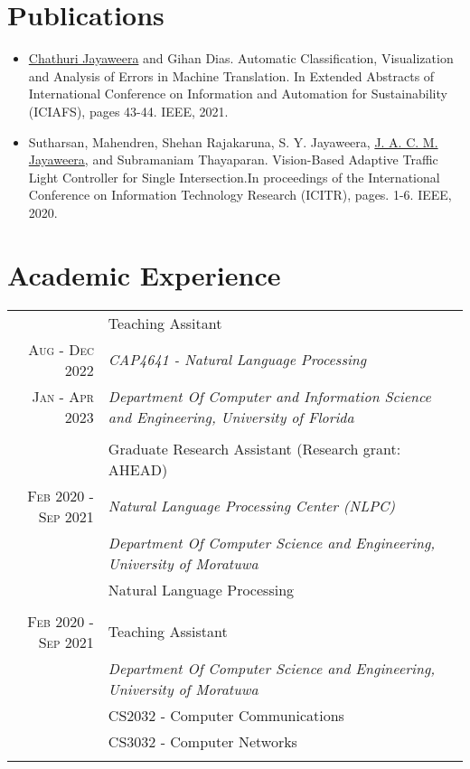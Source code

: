 \documentclass[a4paper,11pt]{article}
\begin{document}
\section{Publications}
\begin{itemize}
\setlength\itemsep{0.01em}
  \item \underline{Chathuri Jayaweera} and Gihan Dias. Automatic Classification, Visualization and Analysis of Errors in Machine Translation. In Extended Abstracts of International Conference on Information and Automation for Sustainability (ICIAFS), pages 43-44. IEEE, 2021.
  \item Sutharsan, Mahendren, Shehan Rajakaruna, S. Y. Jayaweera, \underline{J. A. C. M. Jayaweera}, and Subramaniam Thayaparan. Vision-Based Adaptive Traffic Light Controller for Single Intersection.In proceedings of the International Conference on Information Technology Research (ICITR), pages. 1-6. IEEE, 2020.
\end{itemize}



\section{Academic Experience}
\begin{tabular}{r|p{15cm}}
\emph{} & Teaching Assitant \textsc{}  \\\textsc{ Aug - Dec 2022}&\emph{CAP4641 - Natural Language Processing} \textsc{} \\\textsc{Jan - Apr 2023}&\emph{Department Of Computer and Information Science and Engineering, University of Florida}\\\multicolumn{2}{c}{} \\

 \emph{} & Graduate Research Assistant (Research grant: AHEAD) \textsc{}  \\\textsc{Feb 2020 - Sep 2021}&\emph{Natural Language Processing Center (NLPC)} \\ &\emph{Department Of Computer Science and Engineering, University of Moratuwa}\\&\footnotesize{Natural Language Processing}\\\multicolumn{2}{c}{} \\
 
 \textsc{Feb 2020 - Sep 2021} & Teaching Assistant\\&\emph{Department Of Computer Science and Engineering, University of Moratuwa}\\&\footnotesize{CS2032 - Computer Communications}\\ &\footnotesize{CS3032 - Computer Networks}\\\multicolumn{2}{c}{} \\
 
  
\end{tabular}
\end{document}

